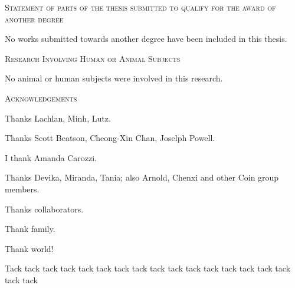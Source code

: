 \vspace{2cm}

\thispagestyle{plain}
\begin{center}
\Large \textsc{Statement of parts of the thesis submitted to qualify for the award of another degree}
\end{center}

No works submitted towards another degree have been included in this thesis.

\vspace{2cm}

\begin{center}
\Large \textsc{Research Involving Human or Animal Subjects}
\end{center}

No animal or human subjects were involved in this research.

\afterpage{\null\thispagestyle{empty}\newpage}
\newpage



\thispagestyle{plain}

\begin{center}
\Large \textsc{Acknowledgements}
\end{center}

Thanks Lachlan, Minh, Lutz.

Thanks Scott Beatson, Cheong-Xin Chan, Joselph Powell.

\vspace{.3cm}

I thank Amanda Carozzi.

\vspace{.3cm}

Thanks Devika, Miranda, Tania; also Arnold, Chenxi and other Coin group members.

Thanks collaborators.

\vspace{.3cm}

Thank family.

\vspace{.3cm}

Thank world!

Tack tack tack tack tack tack tack tack tack tack tack tack tack tack tack tack tack tack

